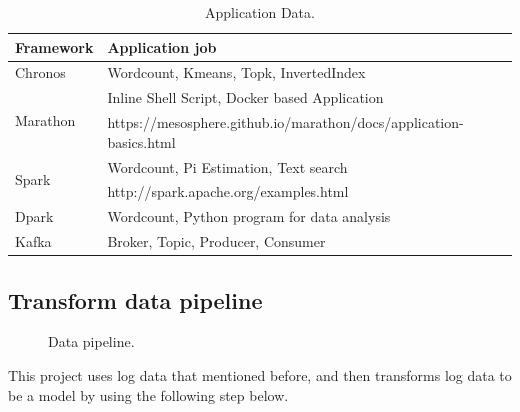 \documentclass[12pt,oneside,openright,a4paper]{cpe-english-project}
\begin{document}
\begin{table}[!h]
\caption{Application Data.}\label{tbl:ApplicationData}
\begin{tabular}{@{}|p{}|p{}|}
\hline
\textbf{Framework} & \textbf{Application job}\\
\hline
Chronos & Wordcount, Kmeans, Topk, InvertedIndex\\
\hline
\multirow{2}{*}{Marathon} & Inline Shell Script, Docker based Application \\
& https://mesosphere.github.io/marathon/docs/application-basics.html\\
\hline
\multirow{2}{*}{Spark} & Wordcount, Pi Estimation, Text search\\
& http://spark.apache.org/examples.html\\
\hline
Dpark & Wordcount, Python program for data analysis\\
\hline
Kafka & Broker, Topic, Producer, Consumer\\
\hline
\end{tabular}
\end{table}

\newpage

\subsection{Transform data pipeline }

\begin{figure}[!h]\centering
\setlength{\fboxrule}{0mm} %
\setlength{\fboxsep}{0cm}
\caption{Data pipeline.}\label{fig:dataPipeline}
\end{figure}

This project uses log data that mentioned before, and then transforms log data to be a model by using the following step below.
\end{document}
